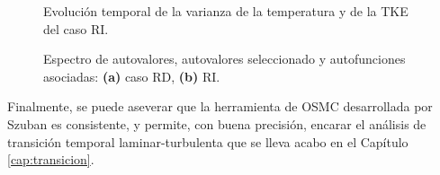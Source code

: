 \begin{figure}[H]
 \centering
 \caption{Evolución temporal de la varianza de la temperatura y de la TKE del caso RI.} 
 \label{fig:Ra65R-DI}
\end{figure}

\begin{figure}[H]
 \centering 
      
 \caption{Espectro de autovalores, autovalores seleccionado y autofunciones asociadas: \textbf{(a)} caso RD, \textbf{(b)} RI.} 
 \label{fig:Ra65-2d}
\end{figure}

Finalmente, se puede aseverar que la herramienta de OSMC desarrollada por Szuban \cite{szuban2023} es consistente, y permite, con buena precisión, encarar el análisis de transición temporal laminar-turbulenta que se lleva acabo en el Capítulo \ref{cap:transicion}.   